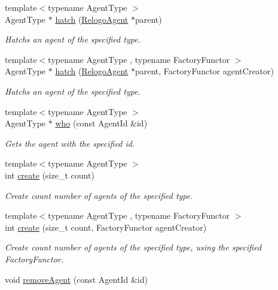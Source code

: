 \begin{DoxyCompactItemize}
\item 
{\footnotesize template$<$typename Agent\-Type $>$ }\\Agent\-Type $\ast$ \hyperlink{classrepast_1_1relogo_1_1_observer_ae9bccf456c22ebdc3faf71ca1ebc9931}{hatch} (\hyperlink{classrepast_1_1relogo_1_1_relogo_agent}{Relogo\-Agent} $\ast$parent)
\begin{DoxyCompactList}\small\item\em Hatchs an agent of the specified type. \end{DoxyCompactList}\item 
{\footnotesize template$<$typename Agent\-Type , typename Factory\-Functor $>$ }\\Agent\-Type $\ast$ \hyperlink{classrepast_1_1relogo_1_1_observer_afece369146d9b5c0f4ec1a46e8d570e1}{hatch} (\hyperlink{classrepast_1_1relogo_1_1_relogo_agent}{Relogo\-Agent} $\ast$parent, Factory\-Functor agent\-Creator)
\begin{DoxyCompactList}\small\item\em Hatchs an agent of the specified type. \end{DoxyCompactList}\item 
{\footnotesize template$<$typename Agent\-Type $>$ }\\Agent\-Type $\ast$ \hyperlink{classrepast_1_1relogo_1_1_observer_a00d27f676b62f1c0dbd5d30e842983ca}{who} (const Agent\-Id \&id)
\begin{DoxyCompactList}\small\item\em Gets the agent with the specified id. \end{DoxyCompactList}\item 
{\footnotesize template$<$typename Agent\-Type $>$ }\\int \hyperlink{classrepast_1_1relogo_1_1_observer_adf2bea53506dfc407f5c72ad506f634f}{create} (size\-\_\-t count)
\begin{DoxyCompactList}\small\item\em Create count number of agents of the specified type. \end{DoxyCompactList}\item 
{\footnotesize template$<$typename Agent\-Type , typename Factory\-Functor $>$ }\\int \hyperlink{classrepast_1_1relogo_1_1_observer_a560cc8f342873668d6ffedd980bbd623}{create} (size\-\_\-t count, Factory\-Functor agent\-Creator)
\begin{DoxyCompactList}\small\item\em Create count number of agents of the specified type, using the specified Factory\-Functor. \end{DoxyCompactList}\item 
\hypertarget{classrepast_1_1relogo_1_1_observer_a4f788359649fb91f08284628aa86e23d}{void \hyperlink{classrepast_1_1relogo_1_1_observer_a4f788359649fb91f08284628aa86e23d}{remove\-Agent} (const Agent\-Id \&id)}\label{classrepast_1_1relogo_1_1_observer_a4f788359649fb91f08284628aa86e23d}


\end{DoxyCompactItemize}
